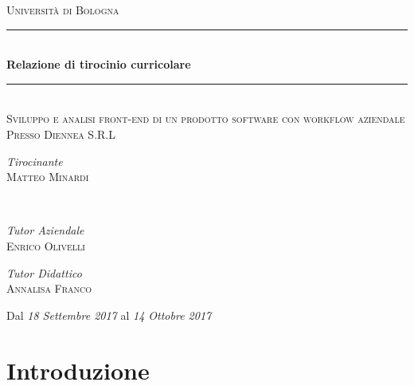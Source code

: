 \documentclass[a4paper]{article}
\begin{document}
\begin{titlepage}
	\newcommand{\HRule}{\rule{\linewidth}{0.1 mm}}
	\center
	\textsc{\LARGE Università di Bologna}\\[1.5cm] %
	
	\HRule\\[0.8 cm]
	{\huge\bfseries Relazione di tirocinio curricolare}\\[0.4cm] %
  \HRule\\[1.5cm]
  
	\textsc{\Large Sviluppo e analisi front-end di un prodotto software con workflow
	aziendale}\\[0.3cm] %
	\textsc{\large Presso Diennea S.R.L}\\[1.5cm] %
	
	
	\begin{minipage}{0.4\textwidth}
		\begin{flushleft}
			\large
			\textit{Tirocinante}\\
			\textsc{Matteo Minardi}
		\end{flushleft}
	\end{minipage}
	~
	\begin{minipage}{0.4\textwidth}
		\begin{flushright}
			\large
			\textit{Tutor Aziendale}\\
			\textsc{Enrico Olivelli} %
    \end{flushright}
    \begin{flushright}
			\large
			\textit{Tutor Didattico}\\
			\textsc{Annalisa Franco} %
		\end{flushright}
	\end{minipage}
	

	\vfill\vfill\vfill %
  
  {\large Dal \emph{18 Settembre 2017} al \emph{14 Ottobre 2017}}\\[1 cm] %
\end{titlepage}

\section{Introduzione}
\label{sec:Introduzione}
\end{document}
